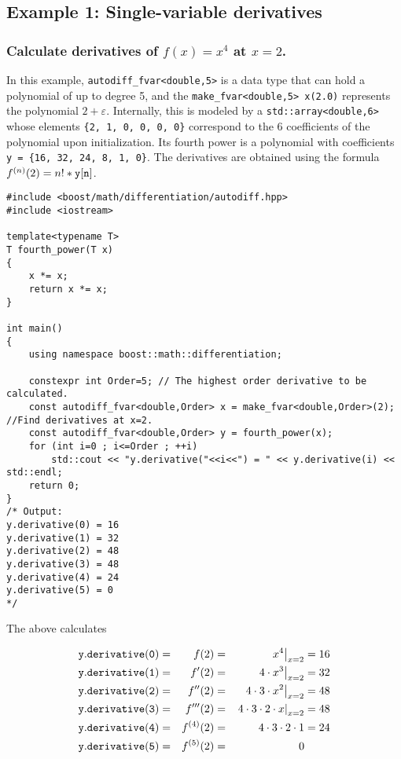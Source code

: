 \documentclass{article}
\begin{document}
\subsection{Example 1: Single-variable derivatives}

\subsubsection{Calculate derivatives of $f(x)=x^4$ at $x=2$.}

In this example, {\tt autodiff\_fvar<double,5>} is a data type that can hold a polynomial of up to degree 5, and
the {\tt make\_fvar<double,5> x(2.0)} represents the polynomial $2+\varepsilon$.  Internally, this is modeled by
a {\tt std::array<double,6>} whose elements {\tt \{2, 1, 0, 0, 0, 0\}} correspond to the 6 coefficients of the
polynomial upon initialization. Its fourth power is a polynomial with coefficients {\tt y = \{16, 32, 24, 8, 1, 0\}}.
The derivatives are obtained using the formula $f^{(n)}(2)=n!*{\tt y[n]}$.

\begin{verbatim}
#include <boost/math/differentiation/autodiff.hpp>
#include <iostream>

template<typename T>
T fourth_power(T x)
{
    x *= x;
    return x *= x;
}

int main()
{
    using namespace boost::math::differentiation;

    constexpr int Order=5; // The highest order derivative to be calculated.
    const autodiff_fvar<double,Order> x = make_fvar<double,Order>(2); //Find derivatives at x=2.
    const autodiff_fvar<double,Order> y = fourth_power(x);
    for (int i=0 ; i<=Order ; ++i)
        std::cout << "y.derivative("<<i<<") = " << y.derivative(i) << std::endl;
    return 0;
}
/* Output:
y.derivative(0) = 16
y.derivative(1) = 32
y.derivative(2) = 48
y.derivative(3) = 48
y.derivative(4) = 24
y.derivative(5) = 0
*/
\end{verbatim}
The above calculates

\begin{alignat*}{3}
{\tt y.derivative(0)} &=& f(2) =&& \left.x^4\right|_{x=2} &= 16\\
{\tt y.derivative(1)} &=& f'(2) =&& \left.4\cdot x^3\right|_{x=2} &= 32\\
{\tt y.derivative(2)} &=& f''(2) =&& \left.4\cdot 3\cdot x^2\right|_{x=2} &= 48\\
{\tt y.derivative(3)} &=& f'''(2) =&& \left.4\cdot 3\cdot2\cdot x\right|_{x=2} &= 48\\
{\tt y.derivative(4)} &=& f^{(4)}(2) =&& 4\cdot 3\cdot2\cdot1 &= 24\\
{\tt y.derivative(5)} &=& f^{(5)}(2) =&& 0 &
\end{alignat*}
\end{document}
